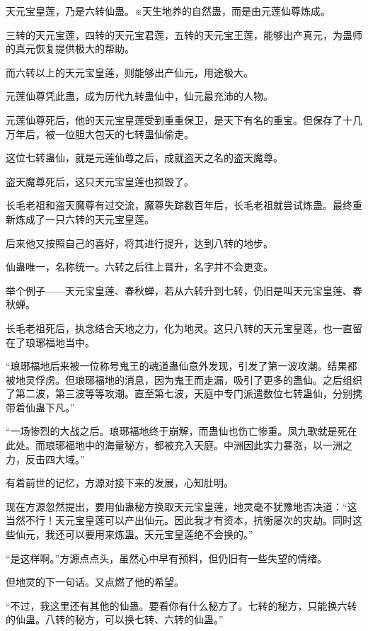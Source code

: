 
\begin{this_body}

天元宝皇莲，乃是六转仙蛊。※天生地养的自然蛊，而是由元莲仙尊炼成。

三转的天元宝莲，四转的天元宝君莲，五转的天元宝王莲，能够出产真元，为蛊师的真元恢复提供极大的帮助。

而六转以上的天元宝皇莲，则能够出产仙元，用途极大。

元莲仙尊凭此蛊，成为历代九转蛊仙中，仙元最充沛的人物。

元莲仙尊死后，他的天元宝皇莲受到重重保卫，是天下有名的重宝。但保存了十几万年后，被一位胆大包天的七转蛊仙偷走。

这位七转蛊仙，就是元莲仙尊之后，成就盗天之名的盗天魔尊。

盗天魔尊死后，这只天元宝皇莲也损毁了。

长毛老祖和盗天魔尊有过交流，魔尊失踪数百年后，长毛老祖就尝试炼蛊。最终重新炼成了一只六转的天元宝皇莲。

后来他又按照自己的喜好，将其进行提升，达到八转的地步。

仙蛊唯一，名称统一。六转之后往上晋升，名字并不会更变。

举个例子——天元宝皇莲、春秋蝉，若从六转升到七转，仍旧是叫天元宝皇莲、春秋蝉。

长毛老祖死后，执念结合天地之力，化为地灵。这只八转的天元宝皇莲，也一直留在了琅琊福地当中。

“琅琊福地后来被一位称号鬼王的魂道蛊仙意外发现，引发了第一波攻潮。结果都被地灵俘虏。但琅琊福地的消息，因为鬼王而走漏，吸引了更多的蛊仙。之后组织了第二波，第三波等等攻潮。直至第七波，天庭中专门派遣数位七转蛊仙，分别携带着仙蛊下凡。”

“一场惨烈的大战之后。琅琊福地终于崩解，而蛊仙也伤亡惨重。凤九歌就是死在此处。而琅琊福地中的海量秘方，都被充入天庭。中洲因此实力暴涨，以一洲之力，反击四大域。”

有着前世的记忆，方源对接下来的发展，心知肚明。

现在方源忽然提出，要用仙蛊秘方换取天元宝皇莲，地灵毫不犹豫地否决道：“这当然不行！天元宝皇莲可以产出仙元。因此我才有资本，抗衡屡次的灾劫。同时这些仙元，我还可以要用来炼蛊。天元宝皇莲绝不会换的。”

“是这样啊。”方源点点头，虽然心中早有预料，但仍旧有一些失望的情绪。

但地灵的下一句话。又点燃了他的希望。

“不过，我这里还有其他的仙蛊。要看你有什么秘方了。七转的秘方，只能换六转的仙蛊。八转的秘方，可以换七转、六转的仙蛊。”


\end{this_body}
